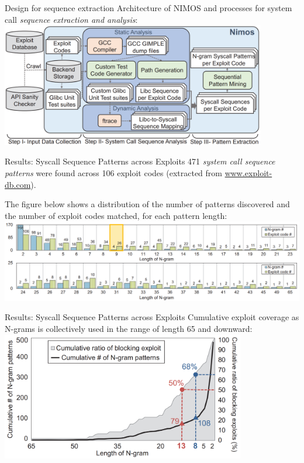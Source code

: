 \documentclass{beamer}
\begin{document}
\begin{frame}{Design for sequence extraction}
Architecture of NIMOS and processes for system call \textit{sequence extraction and analysis}:
\hspace*{0.9cm}\vspace{0.2cm}
\includegraphics[width=0.87\textwidth]
{assets/NIMOS/NIMOS-design.PNG}
\end{frame}

\begin{frame}{Results: Syscall Sequence Patterns across Exploits}
471 \textit{system call sequence patterns} were found across 106 exploit codes (extracted from \url{www.exploit-db.com}). 
\vspace{0.35cm}

The figure below shows a distribution of the number of patterns discovered and the number of exploit codes matched, for each pattern length:
\hspace*{0.9cm}\vspace{0.2cm}
\includegraphics[width=1\textwidth]
{assets/NIMOS/NIMOS-N-grams.PNG}
\end{frame}

\begin{frame}{Results: Syscall Sequence Patterns across Exploits}
Cumulative exploit coverage as N-grams is collectively used in the range of length 65 and downward:
\hspace*{1.5cm}
\includegraphics[width=0.8\textwidth]
{assets/NIMOS/NIMOS-blocking-ratio.PNG}
\end{frame}
\end{document}
